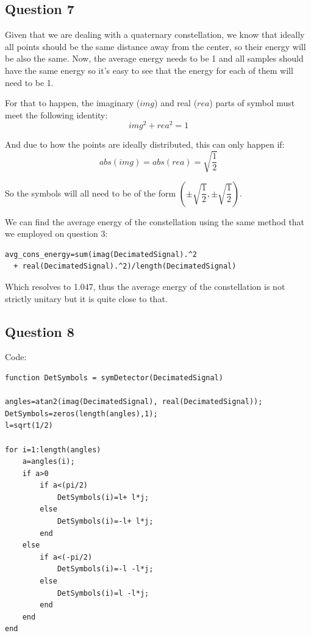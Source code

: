 \documentclass[conference,9pt]{IEEEtran}
\begin{document}
\subsection{Question 7}
Given that we are dealing with a quaternary constellation, we know that ideally all points should be the same distance away from the center, so their energy will be also the same. Now, the average energy needs to be 1 and all samples should have the same energy so it's easy to see that the energy for each of them will need to be 1.

For that to happen, the imaginary ($img$) and real ($rea$) parts of symbol must meet the following identity:
$$img^2+rea^2=1$$

And due to how the points are ideally distributed, this can only happen  if:
$$abs(img)=abs(rea)=\sqrt{\dfrac{1}{2}}$$

So the symbols will all need to be of the form $(\pm\sqrt{\dfrac{1}{2}}, \pm\sqrt{\dfrac{1}{2}})$.

We can find the average energy of the constellation using the same method that we employed on question 3:
\begin{verbatim}
avg_cons_energy=sum(imag(DecimatedSignal).^2
  + real(DecimatedSignal).^2)/length(DecimatedSignal)
\end{verbatim}

Which resolves to 1.047, thus the average energy of the constellation is not strictly unitary but it is quite close to that.

\pagebreak
\subsection{Question 8}
Code:
\begin{verbatim}
function DetSymbols = symDetector(DecimatedSignal)

angles=atan2(imag(DecimatedSignal), real(DecimatedSignal));
DetSymbols=zeros(length(angles),1);
l=sqrt(1/2)

for i=1:length(angles)
    a=angles(i);
    if a>0
        if a<(pi/2)
            DetSymbols(i)=l+ l*j;
        else
            DetSymbols(i)=-l+ l*j;
        end
    else
        if a<(-pi/2)
            DetSymbols(i)=-l -l*j;
        else
            DetSymbols(i)=l -l*j;
        end
    end
end
\end{verbatim}
\end{document}

